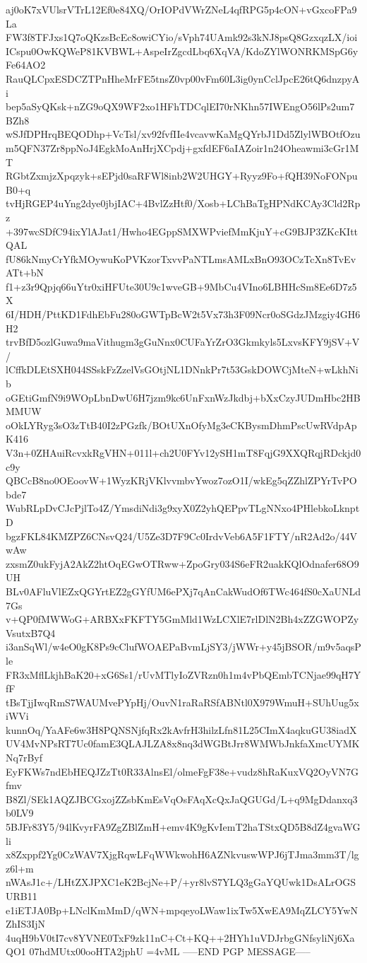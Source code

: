 aj0oK7xVUlsrVTrL12Ef0e84XQ/OrIOPdVWrZNeL4qfRPG5p4cON+vGxcoFPa9La
FW3f8TFJxs1Q7oQKzsBcEc8owiCYio/sVph74UAmk92s3kNJ8psQ8GzxqzLX/ioi
ICspu0OwKQWeP81KVBWL+AspeIrZgcdLbq6XqVA/KdoZYlWONRKMSpG6yFe64AO2
RauQLCpxESDCZTPnHheMrFE5tnsZ0vp00vFm60L3ig0ynCclJpcE26tQ6dnzpyAi
bep5aSyQKsk+nZG9oQX9WF2xo1HFhTDCqlEI70rNKhn57IWEngO56lPs2um7BZh8
wSJfDPHrqBEQODhp+VcTsl/xv92fvfIIe4vcavwKaMgQYrbJ1Dd5ZlylWBOtfOzu
m5QFN37Zr8ppNoJ4EgkMoAnHrjXCpdj+gxfdEF6aIAZoir1n24Oheawmi3cGr1MT
RGbtZxmjzXpqzyk+sEPjd0saRFWl8inb2W2UHGY+Ryyz9Fo+fQH39NoFONpuB0+q
tvHjRGEP4uYng2dye0jbjIAC+4BvlZzHtf0/Xosb+LChBaTgHPNdKCAy3Cld2Rpz
+397wcSDfC94ixYlAJat1/Hwho4EGppSMXWPviefMmKjuY+cG9BJP3ZKcKIttQAL
fU86kNmyCrYfkMOywuKoPVKzorTxvvPaNTLmsAMLxBnO93OCzTcXn8TvEvATt+bN
f1+z3r9Qpjq66uYtr0xiHFUte30U9c1wveGB+9MbCu4VIno6LBHHcSm8Ee6D7z5X
6I/HDH/PttKD1FdhEbFu280oGWTpBcW2t5Vx73h3F09Ncr0oSGdzJMzgiy4GH6H2
trvBfD5ozlGuwa9maVithugm3gGuNnx0CUFaYrZrO3Gkmkyls5LxvsKFY9jSV+V/
lCffkDLEtSXH044SSskFzZzelVsGOtjNL1DNnkPr7t53GskDOWCjMteN+wLkhNib
oGEtiGmfN9i9WOpLbnDwU6H7jzm9kc6UnFxnWzJkdbj+bXxCzyJUDmHbc2HBMMUW
oOkLYRyg3sO3zTtB40I2zPGzfk/BOtUXnOfyMg3eCKBysmDhmPscUwRVdpApK416
V3n+0ZHAuiRcvxkRgVHN+011l+ch2U0FYv12ySH1mT8FqjG9XXQRqjRDckjd0c9y
QBCcB8no0OEoovW+1WyzKRjVKlvvmbvYwoz7ozO1I/wkEg5qZZhlZPYrTvPObde7
WubRLpDvCJcPjlTo4Z/YmsdiNdi3g9xyX0Z2yhQEPpvTLgNNxo4PHlebkoLknptD
bgzFKL84KMZPZ6CNsvQ24/U5Ze3D7F9Cc0IrdvVeb6A5F1FTY/nR2Ad2o/44VwAw
zxsmZ0ukFyjA2AkZ2htOqEGwOTRww+ZpoGry034S6eFR2uakKQlOdnafer68O9UH
BLv0AFluVlEZxQGYrtEZ2gGYfUM6ePXj7qAnCakWudOf6TWc464fS0cXaUNLd7Gs
v+QP0fMWWoG+ARBXxFKFTY5GmMld1WzLCXlE7rlDlN2Bh4xZZGWOPZyVsutxB7Q4
i3anSqWl/w4eO0gK8Ps9cClufWOAEPaBvmLjSY3/jWWr+y45jBSOR/m9v5aqsPle
FR3xMflLkjhBaK20+xG6Ss1/rUvMTlyIoZVRzn0h1m4vPbQEmbTCNjae99qH7YfF
tBsTjjIwqRmS7WAUMvePYpHj/OuvN1raRaRSfABNtl0X979WmuH+SUhUug5xiWVi
kunnOq/YaAFe6w3H8PQNSNjfqRx2kAvfrH3hilzLfn81L25CImX4aqkuGU38iadX
UV4MvNPsRT7Uc0famE3QLAJLZA8x8nq3dWGBtJrr8WMWbJnkfaXmcUYMKNq7rByf
EyFKWs7ndEbHEQJZzTt0R33AlnsEl/olmeFgF38e+vudz8hRaKuxVQ2OyVN7Gfmv
B8Zl/SEk1AQZJBCGxojZZsbKmEsVqOsFAqXcQxJaQGUGd/L+q9MgDdanxq3b0LV9
5BJFr83Y5/94lKvyrFA9ZgZBlZmH+emv4K9gKvIemT2haTStxQD5B8dZ4gvaWGli
x8Zxppf2Yg0CzWAV7XjgRqwLFqWWkwohH6AZNkvuswWPJ6jTJma3mm3T/lgz6l+m
nWAsJ1c+/LHtZXJPXC1eK2BcjNe+P/+yr8lvS7YLQ3gGaYQUwk1DsALrOGSURB11
e1iETJA0Bp+LNclKmMmD/qWN+mpqeyoLWaw1ixTw5XwEA9MqZLCY5YwNZhIS3IjN
4uqH9bV0tI7cv8YVNE0TxF9zk11nC+Ct+KQ++2HYh1uVDJrbgGNfsyliNj6XaQO1
07hdMUtx00ooHTA2jphU
=4vML
-----END PGP MESSAGE-----
